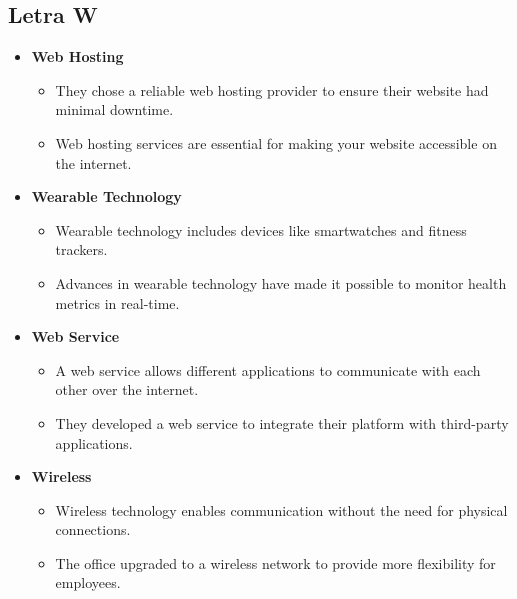     \subsection{Letra W}
    \begin{itemize}
        \item \textbf{Web Hosting}
        \begin{itemize}
            \item They chose a reliable web hosting provider to ensure their website had minimal downtime.
            \item Web hosting services are essential for making your website accessible on the internet.
        \end{itemize}
        \item \textbf{Wearable Technology}
        \begin{itemize}
            \item Wearable technology includes devices like smartwatches and fitness trackers.
            \item Advances in wearable technology have made it possible to monitor health metrics in real-time.
        \end{itemize}
        \item \textbf{Web Service}
        \begin{itemize}
            \item A web service allows different applications to communicate with each other over the internet.
            \item They developed a web service to integrate their platform with third-party applications.
        \end{itemize}
        \item \textbf{Wireless}
        \begin{itemize}
            \item Wireless technology enables communication without the need for physical connections.
            \item The office upgraded to a wireless network to provide more flexibility for employees.
        \end{itemize}
    \end{itemize}
